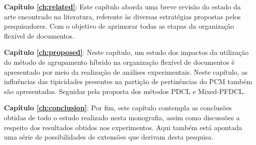 {\bf Capítulo \ref{ch:related}\/}: Este capítulo aborda uma breve revisão do estado da arte encontrado
na literatura, referente às diversas estratégias propostas pelos pesquisadores. Com o objetivo de
aprimorar todas as etapas da organização flexível de documentos. 

{\bf Capítulo \ref{ch:proposed}\/}: Neste capítulo, um estudo dos impactos da
utilização do método de agrupamento híbrido na organização flexível de documentos é apresentado por meio da realização de análises experimentais. Neste capítulo, as influências das tipicidades presentes
na partição de pertinências do PCM também são apresentadas. Seguidas pela proposta dos métodos PDCL e Mixed-PFDCL. 

{\bf Capítulo \ref{ch:conclusion}\/}: Por fim, este capítulo contempla as conclusões obtidas de todo o estudo
realizado nesta monografia, assim como discussões a respeito dos resultados obtidos nos
experimentos. Aqui também está apontada uma série de possibilidades de extensões que derivam desta
pesquisa. 
